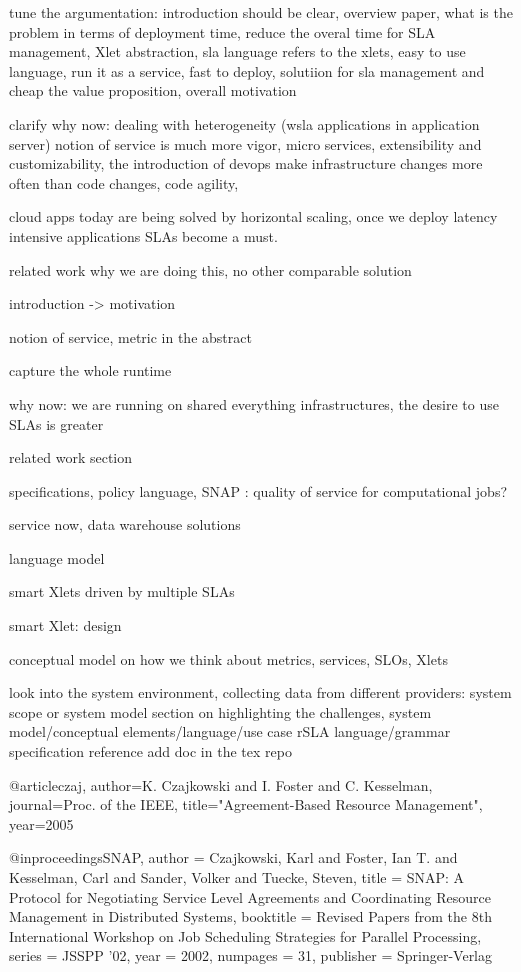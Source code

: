 tune the argumentation: introduction should be clear, overview paper, what is the problem in terms of deployment time, reduce the overal time for SLA management, Xlet abstraction, sla language refers to the xlets, easy to use language, run it as a service, fast to deploy, solutiion for sla management and cheap the value proposition, overall motivation

clarify why now: dealing with heterogeneity (wsla applications in application server) notion of service is much more vigor, micro services,  extensibility and customizability, the introduction of devops make infrastructure changes more often than code changes, code agility, 

cloud apps today are being solved by horizontal scaling, once we deploy latency intensive applications SLAs become a must. 

related work why we are doing this, no other comparable solution

introduction -> motivation 

notion of service, metric in the abstract

capture the whole runtime

why now: we are running on shared everything infrastructures, the desire to use SLAs is greater

related work section

specifications, policy language, SNAP : quality of service for computational jobs? 

service now, data warehouse solutions

language model

smart Xlets driven by multiple SLAs

smart Xlet: design 

conceptual model on how we think about metrics, services, SLOs, Xlets

look into the system environment, collecting data from different providers: system scope or system model 
section on highlighting the challenges, 
system model/conceptual elements/language/use case
rSLA language/grammar specification reference 
add doc in the tex repo





@article{czaj,
author={K. Czajkowski and I. Foster and C. Kesselman},
journal={Proc. of the IEEE}, 
title="{A}greement-{B}ased {R}esource {M}anagement",
year={2005}}

@inproceedings{SNAP, 
author = {Czajkowski, Karl and Foster, Ian T. and Kesselman, Carl and Sander, Volker and Tuecke, Steven},
title = {SNAP: A Protocol for Negotiating Service Level Agreements and Coordinating Resource Management in Distributed Systems},
booktitle = {Revised Papers from the 8th International Workshop on Job Scheduling Strategies for Parallel Processing},
series = {JSSPP '02},
year = {2002},
numpages = {31},
publisher = {Springer-Verlag}
}

